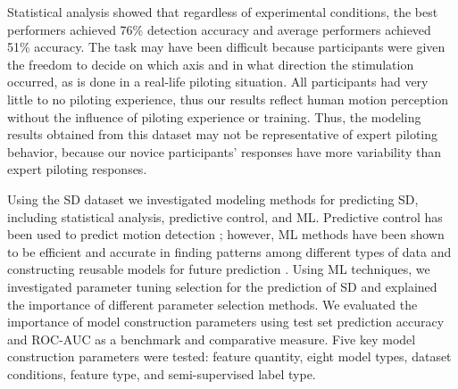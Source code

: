\documentclass{ieeeaccess}
\begin{document}
\indent Statistical analysis showed that regardless of experimental conditions, the best performers achieved 76\% detection accuracy and average performers achieved 51\% accuracy. The task may have been difficult because participants were given the freedom to decide on which axis and in what direction the stimulation occurred, as is done in a real-life piloting situation. All participants had very little to no piloting experience, thus our results reflect human motion perception without the influence of piloting experience or training. Thus, the modeling results obtained from this dataset may not be representative of expert piloting behavior, because our novice participants’ responses have more variability than expert piloting responses.

\indent Using the SD dataset we investigated modeling methods for predicting SD, including statistical analysis, predictive control, and ML. Predictive control has been used to predict motion detection \cite{Soyka_2011_Predicting}; however, ML methods have been shown to be efficient and accurate in finding patterns among different types of data and constructing reusable models for future prediction \cite{Burkov_2019_ML}. Using ML techniques, we investigated parameter tuning selection for the prediction of SD and explained the importance of different parameter selection methods. We evaluated the importance of model construction parameters using test set prediction accuracy and ROC-AUC as a benchmark and comparative measure. Five key model construction parameters were tested: feature quantity, eight model types, dataset conditions, feature type, and semi-supervised label type.
\end{document}
